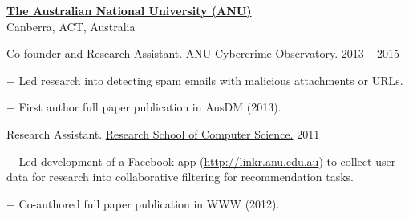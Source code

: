 \documentclass[10pt]{article}
\newcommand{\halfblankline}{\quad\vspace{-0.5\baselineskip}\pagebreak[3]}
\begin{document}
\halfblankline

\href{http://www.anu.edu.au/}{\textbf{The Australian National University (ANU)}}\\
Canberra, ACT, Australia

\begin{outerlist}
	\item Co-founder and Research Assistant. \href{http://sociology.cass.anu.edu.au/centres/anu-cybercrime}{ANU Cybercrime Observatory.} \hfill {2013 -- 2015}
	\begin{innerlist}
		\item[$-$] Led research into detecting spam emails with malicious attachments or URLs.
		\item[$-$] First author full paper publication in AusDM (2013).
    \end{innerlist}
	
	\halfblankline
	
	\item Research Assistant. \href{http://cs.anu.edu.au/}{Research School of Computer Science.} \hfill {2011}
	\begin{innerlist}
		\item[$-$] Led development of a Facebook app (\href{http://linkr.anu.edu.au}{http://linkr.anu.edu.au}) to collect user data for research into collaborative filtering for recommendation tasks.
		\item[$-$] Co-authored full paper publication in WWW (2012).
	\end{innerlist}
\end{outerlist}
\end{document}
